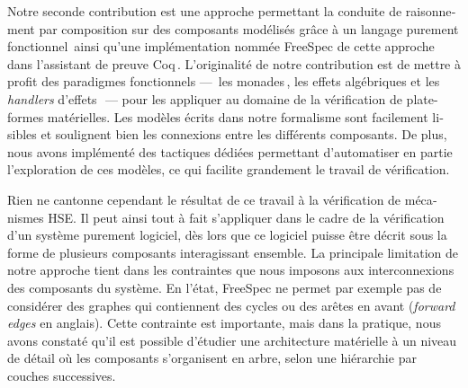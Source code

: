 \begin{otherlanguage}{french}
  Notre seconde contribution est une approche permettant la conduite de
  raisonnement par composition sur des composants modélisés grâce à un langage
  purement fonctionnel\,\cite{letan2018freespec} ainsi qu’une implémentation
  nommée FreeSpec de cette approche\,\cite{letan2018freespeccode} dans
  l’assistant de preuve Coq\,\cite{coq}.
  L’originalité de notre contribution est de mettre à profit des paradigmes
  fonctionnels ---~les monades\,\cite{jones2005io}, les effets algébriques et
  les \emph{handlers} d’effets\,\cite{bauer2015effects}~--- pour les appliquer
  au domaine de la vérification de plate-formes matérielles.
  Les modèles écrits dans notre formalisme sont facilement lisibles et soulignent bien les
  connexions entre les différents composants.
  De plus, nous avons implémenté des tactiques dédiées permettant d’automatiser
  en partie l’exploration de ces modèles, ce qui facilite grandement le travail
  de vérification.

  Rien ne cantonne cependant le résultat de ce travail à la vérification de mécanismes HSE.
  Il peut ainsi tout à fait s’appliquer dans le cadre de la
  vérification d’un système purement logiciel, dès lors que ce logiciel puisse être décrit sous la forme de
   plusieurs composants interagissant ensemble.
  La principale limitation de notre approche tient dans les contraintes que nous
  imposons aux interconnexions des composants du système.
  En l’état, FreeSpec ne permet par exemple pas de considérer des graphes qui
  contiennent des cycles ou des \og{} arêtes en avant \fg{} (\emph{forward
    edges} en anglais).
  Cette contrainte est importante, mais dans la pratique, nous avons constaté
  qu’il est possible d’étudier une architecture matérielle à un niveau de détail
  où les composants s’organisent en arbre, selon une hiérarchie par couches
  successives.


\end{otherlanguage}
